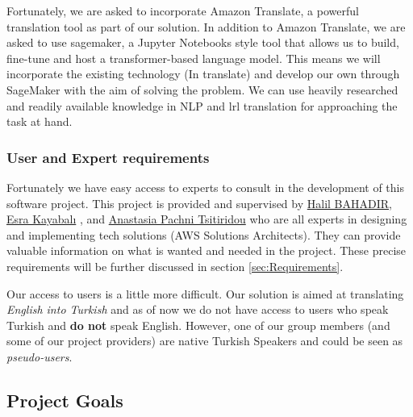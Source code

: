 \indent Fortunately, we are asked to incorporate Amazon Translate, a powerful translation tool as part of our solution. In addition to Amazon Translate, we are asked to use \gls{sagemaker}, a Jupyter Notebooks style tool that allows us to build, fine-tune and host a transformer-based language model. This means we will incorporate the existing technology (In \gls{translate}) and develop our own through SageMaker with the aim of solving the problem. We can use heavily researched and readily available knowledge in \gls{NLP} \cite{NLP_Today} and \gls{lrl} translation \cite{NLP_for_LRR} \cite{Building_LRR_Translation} for approaching the task at hand.


\subsubsection{User and Expert requirements}
\indent \indent Fortunately we have easy access to experts to consult in the development of this software project. This project is provided and supervised by \href{https://www.linkedin.com/in/halil-bahadir-6588671/?originalSubdomain=nl}{Halil BAHADIR}, \href{https://www.linkedin.com/in/esrakayabali/?originalSubdomain=tr}{Esra Kayabalı} , and  \href{https://www.linkedin.com/in/aipachni/}{Anastasia Pachni Tsitiridou} who are all experts in designing and implementing tech solutions (AWS Solutions Architects). They can provide valuable information on what is wanted and needed in the project. These precise requirements will be further discussed in section \ref{sec:Requirements}. 

\indent Our access to users is a little more difficult. Our solution is aimed at translating \textit{English into Turkish} and as of now we do not have access to users who speak Turkish and \textbf{do not} speak English. However, one of our group members (and some of our project providers) are native Turkish Speakers and could be seen as \textit{pseudo-users}.

\subsection{Project Goals}
